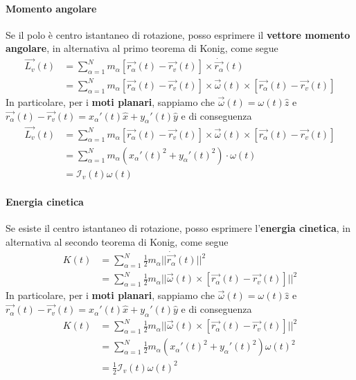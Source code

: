 \paragraph{Momento angolare} Se il polo è centro istantaneo di rotazione, posso esprimere il \textbf{vettore momento angolare}, in alternativa al primo teorema di Konig, come segue
\begin{equation}
	\begin{split}
		\vec{L_v}(t) & = \sum_{\alpha=1}^N m_\alpha [\vec{r_\alpha}(t) - \vec{r_v}(t)] \times \dot{\vec{r_\alpha}}(t) \\
		& = \sum_{\alpha=1}^N m_\alpha[\vec{r_\alpha}(t) - \vec{r_v}(t)] \times \vec{\omega}(t) \times [\vec{r_\alpha}(t) - \vec{r_v}(t)]
	\end{split}
\end{equation}
In particolare, per i \textbf{moti planari}, sappiamo che $\vec{\omega}(t) = \omega (t)\widehat{z}$ e $\vec{r_\alpha}(t) - \vec{r_v}(t) = x_\alpha'(t) \widehat{x}+y_\alpha'(t) \widehat{y}$ e di conseguenza
\begin{equation}
	\label{eq:motocir}
	\begin{split}
		\vec{L_v}(t) & = \sum_{\alpha=1}^N m_\alpha[\vec{r_\alpha}(t) - \vec{r_v}(t)] \times \vec{\omega}(t) \times [\vec{r_\alpha}(t) - \vec{r_v}(t)] \\
		& = \sum_{\alpha=1}^N m_\alpha (x_\alpha'(t)^2+y_\alpha'(t)^2) \cdot \omega(t) \\
		& = \mathcal{I}_v(t) \omega(t)
	\end{split}
\end{equation}


\paragraph{Energia cinetica} Se esiste il centro istantaneo di rotazione, posso esprimere l'\textbf{energia cinetica}, in alternativa al secondo teorema di Konig, come segue
\begin{equation}
	\begin{split}
		K(t) & = \sum_{\alpha=1}^N \frac{1}{2} m_\alpha \lvert\lvert \dot{\vec{r_\alpha}}(t) \rvert\rvert^2 \\
		& = \sum_{\alpha=1}^N \frac{1}{2} m_\alpha \lvert\lvert \vec{\omega}(t) \times [\vec{r_\alpha}(t) - \vec{r_v}(t)] \rvert\rvert^2
	\end{split}
\end{equation}
In particolare, per i \textbf{moti planari}, sappiamo che $\vec{\omega}(t) = \omega (t)\widehat{z}$ e $\vec{r_\alpha}(t) - \vec{r_v}(t) = x_\alpha'(t) \widehat{x}+y_\alpha'(t) \widehat{y}$ e di conseguenza
\begin{equation}
	\label{eq:encir}
	\begin{split}
		K(t) & = \sum_{\alpha=1}^N \frac{1}{2} m_\alpha \lvert\lvert \vec{\omega}(t) \times [\vec{r_\alpha}(t) - \vec{r_v}(t)] \rvert\rvert^2 \\
		& = \sum_{\alpha=1}^N \frac{1}{2} m_\alpha (x_\alpha'(t)^2 + y_\alpha'(t)^2)\omega(t)^2\\
		& = \frac{1}{2}\mathcal{I}_v(t) \omega(t)^2
	\end{split}
\end{equation}

